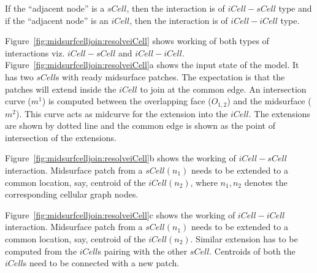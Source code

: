 

If the ``adjacent node'' is a $sCell$, then the interaction is of $iCell-sCell$ type and if the ``adjacent node'' is an $iCell$, then the interaction is of $iCell-iCell$ type.

Figure~\ref{fig:midsurfcelljoin:resolveiCell} shows working of both types of interactions viz. $iCell-sCell$ and $iCell-iCell$. Figure~\ref{fig:midsurfcelljoin:resolveiCell}a shows the input state of the model. It has two $sCell$s with ready midsurface patches. The expectation is that the patches will extend inside the $iCell$ to join at the common edge. An intersection curve ($m^1$) is computed between the overlapping face ($O_{1,2}$) and the midsurface ($m^2$). 
This curve acts as midcurve for the extension into the $iCell$. 
The extensions are shown by dotted line and the common edge is shown as the point of intersection of the extensions. 

Figure~\ref{fig:midsurfcelljoin:resolveiCell}b shows the working of $iCell-sCell$ interaction. Midsurface patch from a $sCell(n_1)$ needs to be extended to a common location, say, centroid of the $iCell(n_2)$, where $n_1,n_2$ denotes the corresponding cellular graph nodes. 

Figure~\ref{fig:midsurfcelljoin:resolveiCell}c shows the working of $iCell-iCell$ interaction. Midsurface patch from a $sCell(n_1)$ needs to be extended to a common location, say, centroid of the $iCell(n_2)$. Similar extension has to be computed from the $iCell$s pairing with the other $sCell$. Centroids of both the $iCell$s need to be connected with a new patch.


